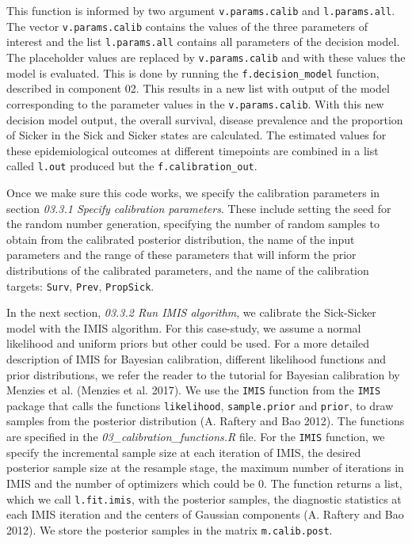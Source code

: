 \documentclass[]{article}
\begin{document}
This function is informed by two argument \texttt{v.params.calib} and
\texttt{l.params.all}. The vector \texttt{v.params.calib} contains the
values of the three parameters of interest and the list
\texttt{l.params.all} contains all parameters of the decision model. The
placeholder values are replaced by \texttt{v.params.calib} and with
these values the model is evaluated. This is done by running the
\texttt{f.decision\_model} function, described in component 02. This
results in a new list with output of the model corresponding to the
parameter values in the \texttt{v.params.calib}. With this new decision
model output, the overall survival, disease prevalence and the
proportion of Sicker in the Sick and Sicker states are calculated. The
estimated values for these epidemiological outcomes at different
timepoints are combined in a list called \texttt{l.out} produced but the
\texttt{f.calibration\_out}.

Once we make sure this code works, we specify the calibration parameters
in section \emph{03.3.1 Specify calibration parameters}. These include
setting the seed for the random number generation, specifying the number
of random samples to obtain from the calibrated posterior distribution,
the name of the input parameters and the range of these parameters that
will inform the prior distributions of the calibrated parameters, and
the name of the calibration targets: \texttt{Surv}, \texttt{Prev},
\texttt{PropSick}.

In the next section, \emph{03.3.2 Run IMIS algorithm}, we calibrate the
Sick-Sicker model with the IMIS algorithm. For this case-study, we
assume a normal likelihood and uniform priors but other could be used.
For a more detailed description of IMIS for Bayesian calibration,
different likelihood functions and prior distributions, we refer the
reader to the tutorial for Bayesian calibration by Menzies et al.
(Menzies et al. 2017). We use the \texttt{IMIS} function from the
\texttt{IMIS} package that calls the functions \texttt{likelihood},
\texttt{sample.prior} and \texttt{prior}, to draw samples from the
posterior distribution (A. Raftery and Bao 2012). The functions are
specified in the \emph{03\_calibration\_functions.R} file. For the
\texttt{IMIS} function, we specify the incremental sample size at each
iteration of IMIS, the desired posterior sample size at the resample
stage, the maximum number of iterations in IMIS and the number of
optimizers which could be 0. The function returns a list, which we call
\texttt{l.fit.imis}, with the posterior samples, the diagnostic
statistics at each IMIS iteration and the centers of Gaussian components
(A. Raftery and Bao 2012). We store the posterior samples in the matrix
\texttt{m.calib.post}.
\end{document}
